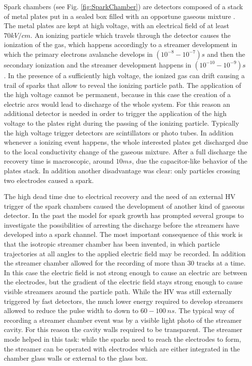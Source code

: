 Spark chambers (see Fig. \ref{fig:SparkChamber}) are detectors composed of a stack of metal plates put in a sealed box filled with an opportune gaseous mixture \cite{wenzel:1966}.
The metal plates are kept at high voltage, with an electrical field of at least $70 kV/cm$.
An ionizing particle which travels through the detector causes the ionization of the gas, which happens accordingly to a streamer development in which the primary electrons avalanche develops in $(10^{-8}-10^{-7})s$ and then the secondary ionization and the streamer development happens in $(10^{-10}-10^{-9})s$ \cite{wenzel:1966}.
In the presence of a sufficiently high voltage, the ionized gas can drift causing a trail of sparks that allow to reveal the ionizing particle path.
The application of the high voltage cannot be permanent, because in this case the creation of a electric arcs would lead to discharge of the whole system.
For this reason an additional detector is needed in order to trigger the application of the high voltage to the plates right during the passing of the ionizing particle.
Typically the high voltage trigger detectors are scintillators or photo tubes. 
In addition whenever a ionizing event happens, the whole interested plates get discharged due to the local conductivity change of the gaseous mixture.
After a full discharge the recovery time is macroscopic, around $10ms$, due the capacitor-like behavior of the plates stack.
In addition another disadvantage was clear: only particles crossing two electrodes caused a spark.

The high dead time due to electrical recovery and the need of an external HV trigger of the spark chambers caused the development of another kind of gaseous detector.
In the past the model for spark growth has prompted several groups \cite{chicovani:1964} to investigate the possibilities of arresting the discharge before the streamers have developed into a spark channel.
The most important consequence of this work is that the isotropic streamer chamber has been invented, in which particle trajectories at all angles to the applied electric field may be recorded.
In addition the streamer chamber allowed for the recording of more than $30$ tracks at a time.
In this case the electric field is not strong enough to cause an electric arc between the electrodes, but the gradient of the electric field stays strong enough to cause visible streamers around the particle path.
While the HV was still externally triggered by fast detectors, the much lower energy required to develop streamers allowed to reduce the pulse width to down to $60-100\ ns$.
The typical way of recording a streamer chamber event was by a visible light photo of the streamer cavity.
For this reason the cavity walls required to be transparent.
The streamer mode helped in this task: while the sparks need to reach the electrodes to form, the streamer can be operated with electrodes which are either integrated in the chamber glass walls or external to the glass box.

